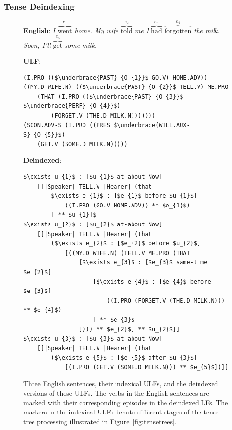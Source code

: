 \subsubsection{Tense Deindexing}

\begin{figure}

\textbf{English}: \textit{I $\overbrace{\text{went}}^{e_{1}}$ home. My wife $\overbrace{\text{told}}^{e_{2}}$ me I $\overbrace{\text{had}}^{e_{3}}$ $\overbrace{\text{forgotten}}^{e_{4}}$ the milk. Soon, I'll $\overbrace{\text{get}}^{e_{5}}$ some milk.}

\textbf{ULF}:
\begin{lstlisting}[xleftmargin=1em,style=ELtiny,mathescape=true]
(I.PRO (($\underbrace{PAST}_{O_{1}}$ GO.V) HOME.ADV))
((MY.D WIFE.N) (($\underbrace{PAST}_{O_{2}}$ TELL.V) ME.PRO
    (THAT (I.PRO (($\underbrace{PAST}_{O_{3}}$ $\underbrace{PERF}_{O_{4}}$)
        (FORGET.V (THE.D MILK.N)))))))
(SOON.ADV-S (I.PRO ((PRES $\underbrace{WILL.AUX-S}_{O_{5}}$)
    (GET.V (SOME.D MILK.N)))))
\end{lstlisting}

\textbf{Deindexed}: \begin{lstlisting}[xleftmargin=1em,style=ELtiny,mathescape=true]
$\exists u_{1}$ : [$u_{1}$ at-about Now]
    [[|Speaker| TELL.V |Hearer| (that
        $\exists e_{1}$ : [$e_{1}$ before $u_{1}$]
            ((I.PRO (GO.V HOME.ADV)) ** $e_{1}$)
        ] ** $u_{1}]$
$\exists u_{2}$ : [$u_{2}$ at-about Now]
    [[|Speaker| TELL.V |Hearer| (that
        ($\exists e_{2}$ : [$e_{2}$ before $u_{2}$]
            [((MY.D WIFE.N) (TELL.V ME.PRO (THAT
                [$\exists e_{3}$ : [$e_{3}$ same-time $e_{2}$]
                    [$\exists e_{4}$ : [$e_{4}$ before $e_{3}$]
                        ((I.PRO (FORGET.V (THE.D MILK.N))) ** $e_{4}$)
                    ] ** $e_{3}$
                ]))) ** $e_{2}$] ** $u_{2}$]]
$\exists u_{3}$ : [$u_{3}$ at-about Now]
    [[|Speaker| TELL.V |Hearer| (that
        ($\exists e_{5}$ : [$e_{5}$ after $u_{3}$]
            [(I.PRO (GET.V (SOME.D MILK.N))) ** $e_{5}$])]]
\end{lstlisting}


%

    \caption{Three English sentences, their indexical ULFs, and the deindexed versions of those ULFs. The verbs in the English sentences are marked with their corresponding episodes in the deindexed LFs. The markers in the indexical ULFs denote different stages of the tense tree processing illustrated in Figure~\ref{fig:tensetrees}.}
    \label{fig:deindexed_ulf}
\end{figure}

